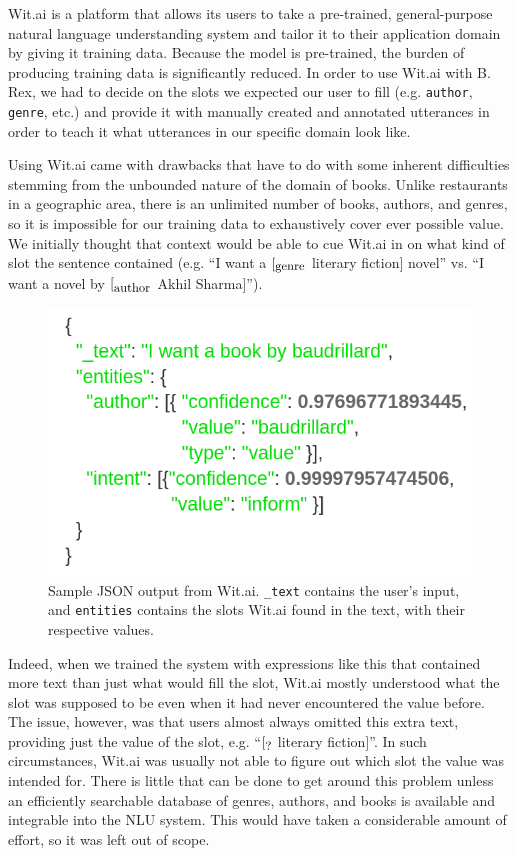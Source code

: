 \documentclass[11pt,a4paper]{article}
\begin{document}
Wit.ai is a platform that allows its users to take a pre-trained, general-purpose natural language understanding system and tailor it to their application domain by giving it training data. Because the model is pre-trained, the burden of producing training data is significantly reduced. In order to use Wit.ai with B. Rex, we had to decide on the slots we expected our user to fill (e.g. {\tt author}, {\tt genre}, etc.) and provide it with manually created and annotated utterances in order to teach it what utterances in our specific domain look like.

Using Wit.ai came with drawbacks that have to do with some inherent difficulties stemming from the unbounded nature of the domain of books. Unlike restaurants in a geographic area, there is an unlimited number of books, authors, and genres, so it is impossible for our training data to exhaustively cover ever possible value. We initially thought that context would be able to cue Wit.ai in on what kind of slot the sentence contained (e.g. ``I want a $[_{\mbox{\small genre}}$ literary fiction$]$ novel'' vs. ``I want a novel by $[_{\mbox{\small author}}$ Akhil Sharma$]$''). 
\begin{figure}
    \centering
    \includegraphics[scale=0.3]{witout.png}
    \caption{Sample JSON output from Wit.ai. {\tt \_text} contains the user's input, and {\tt entities} contains the slots Wit.ai found in the text, with their respective values.}
    \label{fig:without}
\end{figure}

Indeed, when we trained the system with expressions like this that contained more text than just what would fill the slot, Wit.ai mostly understood what the slot was supposed to be even when it had never encountered the value before. The issue, however, was that users almost always omitted this extra text, providing just the value of the slot, e.g. ``$[_{\mbox{\small ?}}$ literary fiction$]$''. In such circumstances, Wit.ai was usually not able to figure out which slot the value was intended for.  There is little that can be done to get around this problem unless an efficiently searchable database of genres, authors, and books is available and integrable into the NLU system. This would have taken a considerable amount of effort, so it was left out of scope.
\end{document}
